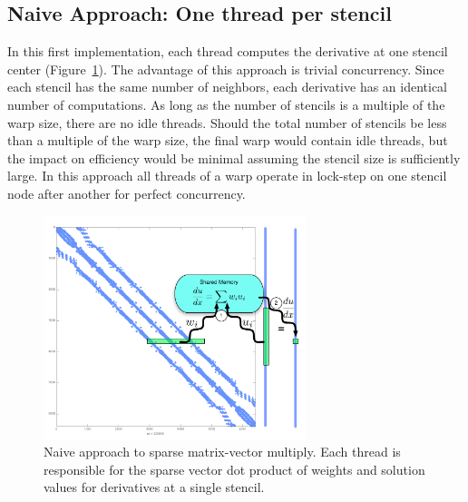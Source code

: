 \documentclass{report}
\begin{document}



\subsection{Naive Approach: One thread per stencil}

In this first implementation, each thread computes 
the derivative at one stencil center  (Figure~\ref{fig:oneThreadPerStencil}). 
The advantage of this approach is trivial concurrency.  Since each stencil has the same number of neighbors, each derivative has an identical number of computations. As long as the number of stencils is a multiple of the warp size, there are no idle threads. Should the total number of stencils be less than a multiple of the warp size, the final warp would contain idle threads, but the impact on efficiency would be minimal assuming the stencil size is sufficiently large. In this approach all threads of a warp operate in lock-step on one stencil node after another for perfect concurrency. 

\begin{figure}[ht]
      \centering
       \includegraphics[width=3in]{../figures/paper1/figures/omnigraffle/oneThreadPerStencil.pdf}
      \caption{Naive approach to sparse matrix-vector multiply. Each thread is responsible for the sparse vector dot product of weights and solution values for derivatives at a single stencil.  }
      \label{fig:oneThreadPerStencil}
\end{figure}
\end{document}
